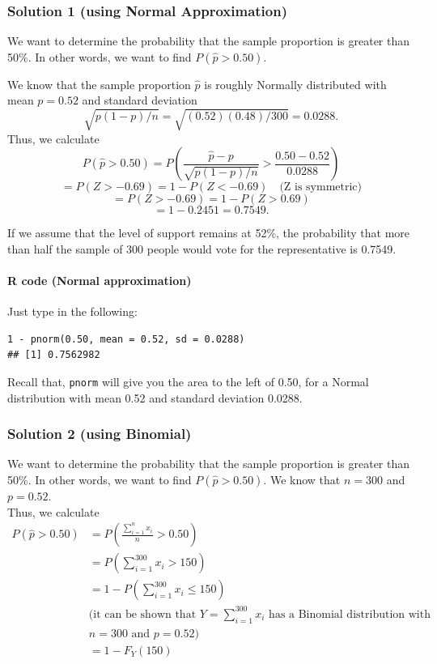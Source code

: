 \vspace{1em}
\subsubsection*{Solution 1 (using Normal Approximation)}

We want to determine the probability that the sample proportion is greater than 50\%. In other words, we want to find $P(\hat{p} > 0.50)$.

We know that the sample proportion $\hat{p}$ is roughly Normally distributed with mean $p = 0.52$ and standard deviation
\[
\sqrt{p(1 - p)/n} = \sqrt{(0.52)(0.48)/300} = 0.0288.
\]
Thus, we calculate
\[
P(\hat{p} > 0.50) = P\left( \frac{\hat{p} - p}{\sqrt{p(1-p)/n}} > \frac{0.50 - 0.52}{0.0288} \right)
\]
\[
= P(Z > -0.69) = 1 - P(Z < -0.69) \quad \text{(Z is symmetric)}
\]
\[
= P(Z > -0.69) = 1 - P(Z > 0.69)
\]
\[
= 1 - 0.2451 = 0.7549.
\]

If we assume that the level of support remains at 52\%, the probability that more than half the sample of 300 people would vote for the representative is 0.7549.
\paragraph*{R code (Normal approximation)}

Just type in the following:

\begin{verbatim}
1 - pnorm(0.50, mean = 0.52, sd = 0.0288)
## [1] 0.7562982
\end{verbatim}

Recall that, \texttt{pnorm} will give you the area to the left of 0.50, for a Normal distribution with mean 0.52 and standard deviation 0.0288.
\subsubsection*{Solution 2 (using Binomial)}

We want to determine the probability that the sample proportion is greater than 50\%. In other words, we want to find $P(\hat{p} > 0.50)$. We know that 
$n = 300$ and $p = 0.52$. \\
Thus, we calculate
\begin{align*}
P(\hat{p} > 0.50) &= P\left(\frac{\sum_{i=1}^{n} x_i}{n} > 0.50\right) \\
&= P\left(\sum_{i=1}^{300} x_i > 150\right) \\
&= 1 - P\left(\sum_{i=1}^{300} x_i \leq 150\right) \\
&\text{(it can be shown that } Y = \sum_{i=1}^{300} x_i \text{ has a Binomial distribution with} \\
&n = 300 \text{ and } p = 0.52\text{)} \\
&= 1 - F_Y(150)
\end{align*}

